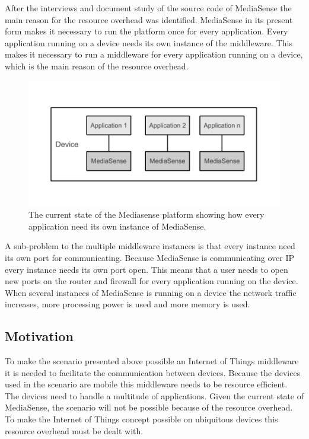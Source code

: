 After the interviews and document study of the source code of MediaSense the main reason for the resource overhead was identified. MediaSense in its present form makes it necessary to run the platform once for every application. Every application running on a device needs its own instance of the middleware. This makes it necessary to run a middleware for every application running on a device, which is the main reason of the resource overhead. 

\begin{figure}[h!]
		\centering
    	\includegraphics[scale=0.75]{part_4/result_and_analysis/mediasense_arch_old.pdf}
		\caption{The current state of the Mediasense platform showing how every application need its own instance of MediaSense.} 
\end{figure}

A sub-problem to the multiple middleware instances is that every instance need its own port for communicating. Because MediaSense is communicating over IP every instance needs its own port open. This means that a user needs to open new ports on the router and firewall for every application running on the device. When several instances of MediaSense is running on a device the network traffic increases, more processing power is used and more memory is used. 

\subsection{Motivation}
To make the scenario presented above possible an Internet of Things middleware it is needed to facilitate the communication between devices. Because the devices used in the scenario are mobile this middleware needs to be resource efficient. The devices need to handle a multitude of applications. Given the current state of MediaSense, the scenario will not be possible because of the resource overhead. To make the Internet of Things concept possible on ubiquitous devices this resource overhead must be dealt with.

